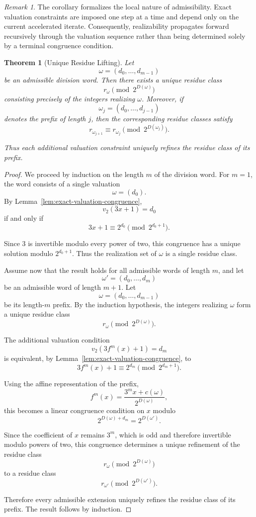 \documentclass[12pt, oneside]{article}
\numberwithin{equation}{section}
\theoremstyle{definition}
\theoremstyle{plain}
\newtheorem{theorem}{Theorem}[section]
\theoremstyle{remark}
\newtheorem*{remark}{Remark}
\begin{document}
\begin{remark}
The corollary formalizes the local nature of admissibility. Exact
valuation constraints are imposed one step at a time and depend only on
the current accelerated iterate. Consequently, realizability propagates
forward recursively through the valuation sequence rather than being
determined solely by a terminal congruence condition.
\end{remark}

\begin{theorem}[Unique Residue Lifting]
\label{thm:unique-residue-lifting}
Let
\[
\omega=(d_0,\dots,d_{m-1})
\]
be an admissible division word.  Then there exists a unique residue class
\[
r_\omega \pmod{2^{D(\omega)}}
\]
consisting precisely of the integers realizing \(\omega\).  Moreover, if
\[
\omega_j=(d_0,\dots,d_{j-1})
\]
denotes the prefix of length \(j\), then the corresponding residue classes satisfy
\[
r_{\omega_{j+1}}
\equiv
r_{\omega_j}
\pmod{2^{D(\omega_j)}}.
\]

Thus each additional valuation constraint uniquely refines the residue
class of its prefix.
\end{theorem}

\begin{proof}
We proceed by induction on the length \(m\) of the division word.
For \(m=1\), the word consists of a single valuation
\[
\omega=(d_0).
\]
By Lemma~\ref{lem:exact-valuation-congruence},
\[
v_2(3x+1)=d_0
\]
if and only if
\[
3x+1
\equiv
2^{d_0}
\pmod{2^{d_0+1}}.
\]

Since \(3\) is invertible modulo every power of two, this congruence has
a unique solution modulo \(2^{d_0+1}\). Thus the realization set of
\(\omega\) is a single residue class.

Assume now that the result holds for all admissible words of length \(m\),
and let
\[
\omega'=(d_0,\dots,d_{m})
\]
be an admissible word of length \(m+1\).  Let
\[
\omega=(d_0,\dots,d_{m-1})
\]
be its length-\(m\) prefix. By the induction hypothesis, the integers
realizing \(\omega\) form a unique residue class
\[
r_\omega
\pmod{2^{D(\omega)}}.
\]

The additional valuation condition
\[
v_2(3f^{m}(x)+1)=d_m
\]
is equivalent, by
Lemma~\ref{lem:exact-valuation-congruence}, to
\[
3f^{m}(x)+1
\equiv
2^{d_m}
\pmod{2^{d_m+1}}.
\]

Using the affine representation of the prefix,
\[
f^{m}(x) = \frac{3^{m}x+c(\omega)}{2^{D(\omega)}},
\]
this becomes a linear congruence condition on \(x\) modulo
\[
2^{D(\omega)+d_m} = 2^{D(\omega')}.
\]

Since the coefficient of \(x\) remains \(3^{m}\), which is odd and therefore
invertible modulo powers of two, this congruence determines a unique
refinement of the residue class
\[
r_\omega
\pmod{2^{D(\omega)}}
\]
to a residue class
\[
r_{\omega'}
\pmod{2^{D(\omega')}}.
\]

Therefore every admissible extension uniquely refines the residue class
of its prefix.  The result follows by induction.
\end{proof}
\end{document}
